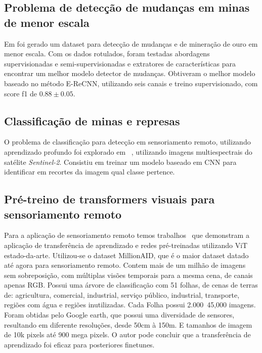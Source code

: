 \subsection{Problema de detecção de mudanças em minas de menor escala}\label{sec:Cap2_deteccao_mudanca}

Em \cite{rs14071746} foi gerado um dataset para detecção de mudanças e de mineração de ouro em menor escala. Com os dados rotulados, foram testadas abordagens supervisionadas e semi-supervisionadas e extratores de características para encontrar um melhor modelo detector de mudanças. Obtiveram o melhor modelo baseado no método E-ReCNN, utilizando seis canais e treino supervisionado, com score f1 de $0.88\pm0.05$.

\subsection{Classificação de minas e represas}\label{sec:Cap2_minas_represa_classificacao}

O problema de classificação para detecção em sensoriamento remoto, utilizando aprendizado profundo foi explorado em ~\cite{s20236936}, utilizando imagens multiespectrais do satélite \textit{Sentinel-2}. Consistiu em treinar um modelo baseado em CNN para identificar em recortes da imagem qual classe pertence.

\subsection{Pré-treino de transformers visuais para sensoriamento remoto}\label{sec:Cap2_million}

Para a aplicação de sensoriamento remoto temos trabalhos~\cite{wang2022empirical} que demonstram a aplicação de transferência de aprendizado e redes pré-treinadas utilizando ViT estado-da-arte. Utilizou-se o dataset MillionAID, que é o maior dataset datado até agora para sensoriamento remoto. Contem mais de um milhão de imagens sem sobreposição, com múltiplas visões temporais para a mesma cena, de canais apenas RGB. Possui uma árvore de classificação com 51 folhas, de cenas de terras de: agricultura, comercial, industrial, serviço público, industrial, transporte, regiões com água e regiões inutilizadas. Cada Folha possui 2.000~45,000 imagens. Foram obtidas pelo Google earth, que possui uma diversidade de sensores, resultando em diferente resoluções, desde 50cm à 150m. E tamanhos de imagem de 10k pixels até 900 mega pixels.
O autor pode concluir que a transferência de aprendizado foi eficaz para posteriores finetunes.

